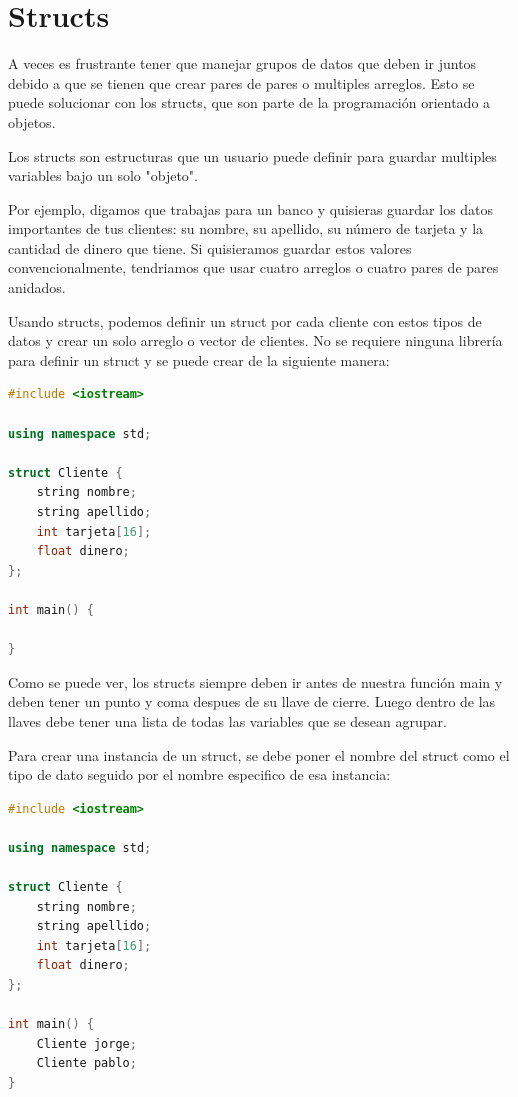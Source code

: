 \documentclass{article}
\begin{document}
\section{Structs}

A veces es frustrante tener que manejar grupos de datos que deben ir juntos debido a que se tienen que crear pares de pares o multiples arreglos. Esto se puede solucionar con los structs, que son parte de la programación orientado a objetos.

Los structs son estructuras que un usuario puede definir para guardar multiples variables bajo un solo "objeto".

Por ejemplo, digamos que trabajas para un banco y quisieras guardar los datos importantes de tus clientes: su nombre, su apellido, su número de tarjeta y la cantidad de dinero que tiene. Si quisieramos guardar estos valores convencionalmente, tendriamos que usar cuatro arreglos o cuatro pares de pares anidados.

Usando structs, podemos definir un struct por cada cliente con estos tipos de datos y crear un solo arreglo o vector de clientes. No se requiere ninguna librería para definir un struct y se puede crear de la siguiente manera:

\begin{lstlisting}[language=C++, title=Definición de un struct]
#include <iostream>

using namespace std;

struct Cliente {
	string nombre;
	string apellido;
	int tarjeta[16];
	float dinero;
};

int main() {

}
\end{lstlisting}

Como se puede ver, los structs siempre deben ir antes de nuestra función main y deben tener un punto y coma despues de su llave de cierre. Luego dentro de las llaves debe tener una lista de todas las variables que se desean agrupar.

Para crear una instancia de un struct, se debe poner el nombre del struct como el tipo de dato seguido por el nombre especifico de esa instancia:

\begin{lstlisting}[language=C++, title=Instanciamiento]
#include <iostream>

using namespace std;

struct Cliente {
	string nombre;
	string apellido;
	int tarjeta[16];
	float dinero;
};

int main() {
	Cliente jorge;
	Cliente pablo;
}
\end{lstlisting}
\end{document}
